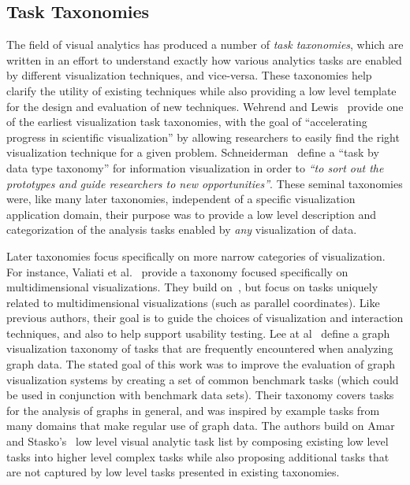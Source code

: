 


\subsection{Task Taxonomies}
The field of visual analytics has produced a number of \textit{task taxonomies}, which are written in an effort to understand exactly how various analytics tasks are enabled by different visualization techniques, and vice-versa.
These taxonomies help clarify the utility of existing techniques while also providing a low level template for the design and evaluation of new techniques.
Wehrend and Lewis~\cite{Wehrend1990} provide one of the earliest visualization task taxonomies, with the goal of ``accelerating progress in scientific visualization'' by allowing researchers to easily find the right visualization technique for a given problem.
Schneiderman~\cite{Shneiderman1996} define a ``task by data type taxonomy'' for information visualization in order to \textit{``to sort out the prototypes and guide researchers to new opportunities''}.
These seminal taxonomies were, like many later taxonomies, independent of a specific visualization application domain, their purpose was to provide a low level description and categorization of the analysis tasks enabled by \textit{any} visualization of data.

Later taxonomies focus specifically on more narrow categories of visualization.
For instance, Valiati et al.~\cite{Valiati2006} provide a taxonomy focused specifically on multidimensional visualizations. They build on~\cite{Wehrend1990}, but focus on tasks uniquely related to multidimensional visualizations (such as parallel coordinates).
Like previous authors, their goal is to guide the choices of visualization and interaction techniques, and also to  help support usability testing.
Lee at al~\cite{Lee2006} define a graph visualization taxonomy of tasks that are frequently encountered when analyzing graph data.
The stated goal of this work was to improve the evaluation of graph visualization systems by creating a set of common benchmark tasks (which could be used in conjunction with benchmark data sets).
Their taxonomy covers tasks for the analysis of graphs in general, and was inspired by example tasks from many domains that make regular use of graph data.
The authors build on Amar and Stasko's~\cite{Amar2005} low level visual analytic task list by composing existing low level tasks into higher level complex tasks while also proposing additional tasks that are not captured by low level tasks presented in existing taxonomies.


